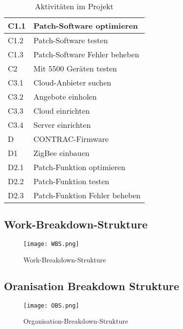 \begin{table}[H]
\begin{center}
\begin{tabular}{l|l}
            C1.1 & Patch-Software optimieren                           \\ \hline
            C1.2 & Patch-Software testen                               \\ \hline
            C1.3 & Patch-Software Fehler beheben                       \\ \hline
            C2   & Mit 5500 Geräten testen                             \\ \hline
            C3.1 & Cloud-Anbieter suchen                               \\ \hline
            C3.2 & Angebote einholen                                   \\ \hline
            C3.3 & Cloud einrichten                                    \\ \hline
            C3.4 & Server einrichten                                   \\ \hline
            D    & CONTRAC-Firmware                                    \\ \hline
            D1   & ZigBee einbauen                                     \\ \hline
            D2.1 & Patch-Funktion optimieren                           \\ \hline
            D2.2 & Patch-Funktion testen                               \\ \hline
            D2.3 & Patch-Funktion Fehler beheben                       \\
        \end{tabular}
        \caption{Aktivitäten im Projekt}
    \end{center}
\end{table}

\subsection{Work-Breakdown-Strukture}
\begin{figure}[H]
    \begin{center}
        \texttt{[image: WBS.png]}
    \end{center}
    \caption{Work-Breakdown-Strukture}
\end{figure}
\subsection{Oranisation Breakdown Strukture}
\begin{figure}[H]
    \begin{center}
        \texttt{[image: OBS.png]}
    \end{center}
    \caption{Organisation-Breakdown-Strukture}
\end{figure}
